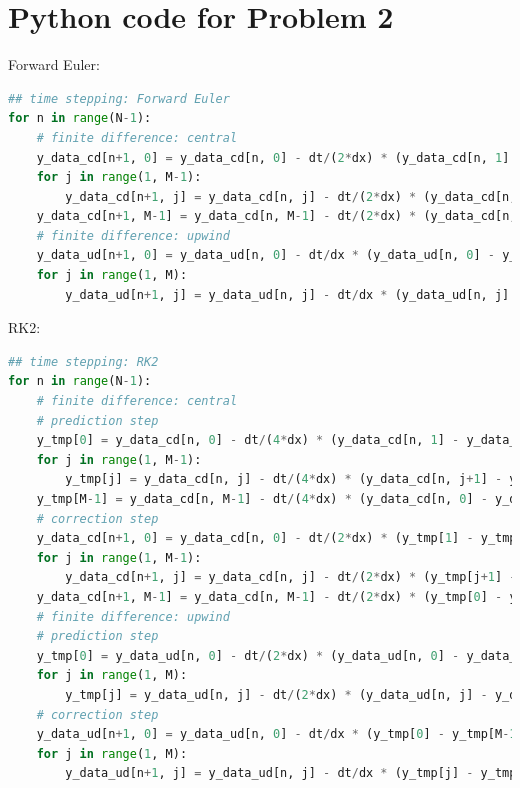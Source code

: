 \documentclass{article}
\begin{document}
\section{Python code for Problem 2}
Forward Euler:
\begin{lstlisting}[language = Python]
## time stepping: Forward Euler
for n in range(N-1):
    # finite difference: central
    y_data_cd[n+1, 0] = y_data_cd[n, 0] - dt/(2*dx) * (y_data_cd[n, 1] - y_data_cd[n, M-1]);
    for j in range(1, M-1):
        y_data_cd[n+1, j] = y_data_cd[n, j] - dt/(2*dx) * (y_data_cd[n, j+1] - y_data_cd[n, j-1]);
    y_data_cd[n+1, M-1] = y_data_cd[n, M-1] - dt/(2*dx) * (y_data_cd[n, 0] - y_data_cd[n, M-2]);
    # finite difference: upwind
    y_data_ud[n+1, 0] = y_data_ud[n, 0] - dt/dx * (y_data_ud[n, 0] - y_data_ud[n, M-1]);
    for j in range(1, M):
        y_data_ud[n+1, j] = y_data_ud[n, j] - dt/dx * (y_data_ud[n, j] - y_data_ud[n, j-1]);
\end{lstlisting}
RK2:
\begin{lstlisting}[language = Python]
## time stepping: RK2
for n in range(N-1):
    # finite difference: central
    # prediction step
    y_tmp[0] = y_data_cd[n, 0] - dt/(4*dx) * (y_data_cd[n, 1] - y_data_cd[n, M-1]);
    for j in range(1, M-1):
        y_tmp[j] = y_data_cd[n, j] - dt/(4*dx) * (y_data_cd[n, j+1] - y_data_cd[n, j-1]);
    y_tmp[M-1] = y_data_cd[n, M-1] - dt/(4*dx) * (y_data_cd[n, 0] - y_data_cd[n, M-2]);
    # correction step
    y_data_cd[n+1, 0] = y_data_cd[n, 0] - dt/(2*dx) * (y_tmp[1] - y_tmp[M-1]);
    for j in range(1, M-1):
        y_data_cd[n+1, j] = y_data_cd[n, j] - dt/(2*dx) * (y_tmp[j+1] - y_tmp[j-1]);
    y_data_cd[n+1, M-1] = y_data_cd[n, M-1] - dt/(2*dx) * (y_tmp[0] - y_tmp[M-2]);
    # finite difference: upwind
    # prediction step
    y_tmp[0] = y_data_ud[n, 0] - dt/(2*dx) * (y_data_ud[n, 0] - y_data_ud[n, M-1]);
    for j in range(1, M):
        y_tmp[j] = y_data_ud[n, j] - dt/(2*dx) * (y_data_ud[n, j] - y_data_ud[n, j-1]);
    # correction step
    y_data_ud[n+1, 0] = y_data_ud[n, 0] - dt/dx * (y_tmp[0] - y_tmp[M-1]);
    for j in range(1, M):
        y_data_ud[n+1, j] = y_data_ud[n, j] - dt/dx * (y_tmp[j] - y_tmp[j-1]);
\end{lstlisting}
\end{document}
